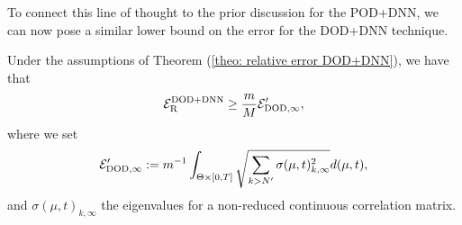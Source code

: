 To connect this line of thought to the prior discussion for the POD+DNN, we can now pose a similar lower bound on
the error for the DOD+DNN technique. 

\begin{theorem} \label{theo: lower bound dod+dnn}
    Under the assumptions of Theorem (\ref{theo: relative error DOD+DNN}), we have that 
    \begin{equation*}
        \mathcal{E}_\text{R}^\text{DOD+DNN} \geq \frac{m}{M} \mathcal{E}'_{\text{DOD}, \infty},
    \end{equation*}
    where we set
    \begin{equation*}
        \mathcal{E}'_{\text{DOD}, \infty} := m^{-1}
    \int_{\Theta \times [0, T]} \sqrt{\sum_{k > N'} \sigma(\mu, t)_{k, \infty}^2} d(\mu, t),
    \end{equation*}
    and $\sigma(\mu, t)_{k, \infty}$ the eigenvalues for a non-reduced continuous correlation matrix.
\end{theorem}
